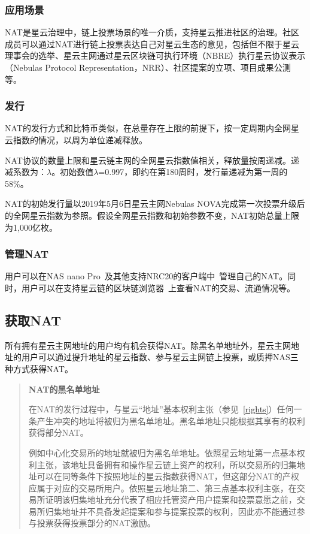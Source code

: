 \subsubsection{应用场景}

NAT是星云治理中，链上投票场景的唯一介质，支持星云推进社区的治理。社区成员可以通过NAT进行链上投票表达自己对星云生态的意见，包括但不限于星云理事会的选举、星云主网通过星云区块链可执行环境（NBRE）执行星云协议表示（Nebulas Protocol Representation，NRR）、社区提案的立项、项目成果公测等。

\subsubsection{发行}
	
NAT的发行方式和比特币类似，在总量存在上限的前提下，按一定周期内全网星云指数的情况，以周为单位递减释放。

NAT协议的数量上限和星云链主网的全网星云指数值相关，释放量按周递减。递减系数为：$\lambda$。初始数值$\lambda$=0.997，即约在第180周时，发行量递减为第一周的58\%。

NAT的初始发行量以2019年5月6日星云主网Nebulas NOVA完成第一次投票升级后的全网星云指数为参照。假设全网星云指数和初始参数不变，NAT初始总量上限为1,000亿枚。

\subsubsection{管理NAT}

用户可以在NAS nano Pro~\cite{NASnano}及其他支持NRC20的客户端中~\cite{wallets}管理自己的NAT。同时，用户可以在支持星云链的区块链浏览器~\cite{explorer}上查看NAT的交易、流通情况等。

\subsection{获取NAT}

所有拥有星云主网地址的用户均有机会获得NAT。除黑名单地址外，星云主网地址的用户可以通过提升地址的星云指数、参与星云主网链上投票，或质押NAS三种方式获得NAT。

\begin{quotation}

\textbf{NAT的黑名单地址}

在NAT的发行过程中，与星云“地址”基本权利主张（参见~\ref{rights}）任何一条产生冲突的地址将被归为黑名单地址。黑名单地址只能根据其享有的权利获得部分NAT。

例如中心化交易所的地址就被归为黑名单地址。依照星云地址第一点基本权利主张，该地址具备拥有和操作星云链上资产的权利，所以交易所的归集地址可以在同等条件下按照地址的星云指数获得NAT，但这部分NAT的产权应属于对应的交易所用户。依照星云地址第二、第三点基本权利主张，在交易所证明该归集地址充分代表了相应托管资产用户提案和投票意愿之前，交易所归集地址并不具备发起提案和参与提案投票的权利，因此亦不能通过参与投票获得投票部分的NAT激励。

\end{quotation}

